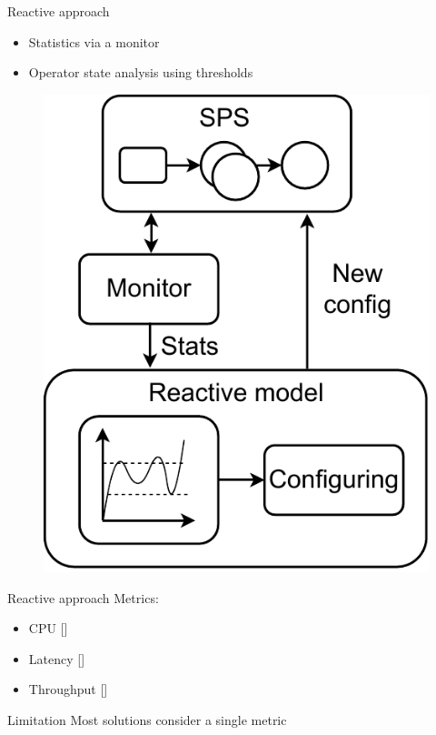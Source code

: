 \begin{frame}{Reactive approach}
	\begin{itemize}
		\item Statistics via a monitor
		\item Operator state analysis using thresholds
	\end{itemize}
	
	\begin{figure}
		\includegraphics[scale=0.45]{images/concepts/RW-Reactive.pdf}
	\end{figure}
\end{frame}

\begin{frame}{Reactive approach}
	Metrics:
	
	\begin{itemize}
		\item CPU [\cite{GulisanoJPSV12}]
		\item Latency [\cite{MadsenZS16, SatzgerHLD11, HeinzeJHF14}]
		\item Throughput [\cite{KahveciG20, RussoCCP21, GedikSHW14}]
	\end{itemize}
	
	\pause
	
	\begin{alertblock}{Limitation}
		Most solutions consider a single metric
	\end{alertblock}
\end{frame}

